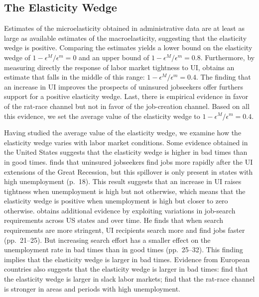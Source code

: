 \documentclass[letterpaper,12pt,leqno]{article}
\def \e{{\epsilon}}
\begin{document}
\subsection{The Elasticity Wedge}

Estimates of the microelasticity obtained in administrative data are at least as large as available estimates of the macroelasticity, suggesting that the elasticity wedge is positive. Comparing the estimates yields a lower bound on the elasticity wedge of $1-\e^M/\e^m = 0$ and an upper bound of $1-\e^M/\e^m = 0.8$. Furthermore, by measuring directly the response of labor market tightness to UI, \citet{M14} obtains an estimate that falls in the middle of this range: $1-\e^{M}/\e^{m}=0.4$. The finding that an increase in UI improves the prospects of uninsured jobseekers offer furthers support for a positive elasticity wedge. Last, there is empirical evidence in favor of the rat-race channel but not in favor of the job-creation channel. Based on all this evidence, we set the average value of the elasticity wedge to $1-\e^{M}/\e^{m}=0.4$.

Having studied the average value of the elasticity wedge, we examine how the elasticity wedge varies with labor market conditions. Some evidence obtained in the United States suggests that the elasticity wedge is higher in bad times than in good times. \citet{V14} finds that uninsured jobseekers find jobs more rapidly after the UI extensions of the Great Recession, but this spillover is only present in states with high unemployment (p.~18). This result suggests that an increase in UI raises tightness when unemployment is high but not otherwise, which means that the elasticity wedge is positive when unemployment is high but closer to zero otherwise. \citet{T17} obtains additional evidence by exploiting variations in job-search requirements across US states and over time. He finds that when search requirements are more stringent, UI recipients search more and find jobs faster (pp.~21--25). But increasing search effort has a smaller effect on the unemployment rate in bad times than in good times (pp.~25--32). This finding implies that the elasticity wedge is larger in bad times. Evidence from European countries also suggests that the elasticity wedge is larger in bad times: \citet[p.~3590]{LLZ12} find that the elasticity wedge is larger in slack labor markets; \citet[pp.~565--567, p.~575]{CDG12} find that the rat-race channel is stronger in areas and periods with high unemployment.
\end{document}
